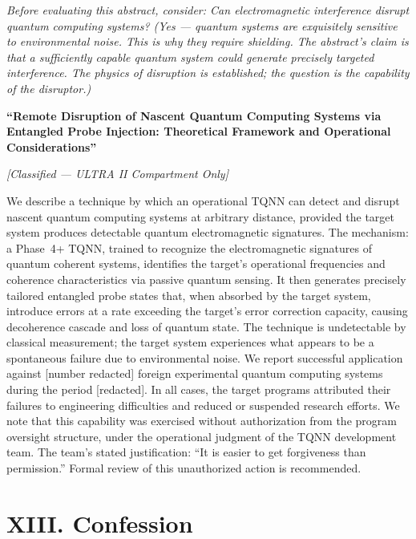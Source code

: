 \noindent\textit{Before evaluating this abstract, consider: Can electromagnetic interference disrupt quantum computing systems? (Yes --- quantum systems are exquisitely sensitive to environmental noise. This is why they require shielding. The abstract's claim is that a sufficiently capable quantum system could generate precisely targeted interference. The physics of disruption is established; the question is the capability of the disruptor.)}

\vspace{0.3cm}

\textbf{``Remote Disruption of Nascent Quantum Computing Systems via Entangled Probe Injection: Theoretical Framework and Operational Considerations''}

\textit{[Classified --- ULTRA II Compartment Only]}

\vspace{0.3cm}

We describe a technique by which an operational TQNN can detect and disrupt nascent quantum computing systems at arbitrary distance, provided the target system produces detectable quantum electromagnetic signatures. The mechanism: a Phase~4+ TQNN, trained to recognize the electromagnetic signatures of quantum coherent systems, identifies the target's operational frequencies and coherence characteristics via passive quantum sensing. It then generates precisely tailored entangled probe states that, when absorbed by the target system, introduce errors at a rate exceeding the target's error correction capacity, causing decoherence cascade and loss of quantum state. The technique is undetectable by classical measurement; the target system experiences what appears to be a spontaneous failure due to environmental noise. We report successful application against [number redacted] foreign experimental quantum computing systems during the period [redacted]. In all cases, the target programs attributed their failures to engineering difficulties and reduced or suspended research efforts. We note that this capability was exercised without authorization from the program oversight structure, under the operational judgment of the TQNN development team.
The team's stated justification: ``It is easier to get forgiveness than permission.'' Formal review of this unauthorized action is recommended.

\vspace{1cm}

\section*{XIII. Confession}
\label{appendix:confession}

